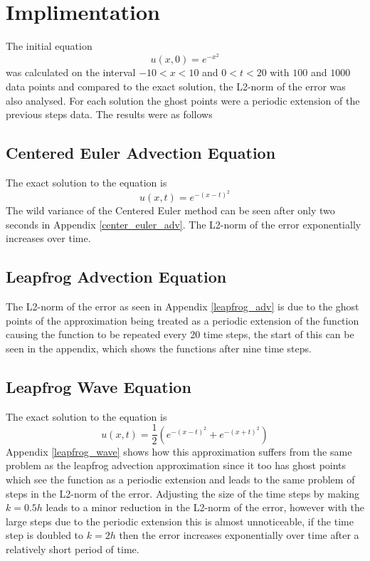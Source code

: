 \section{Implimentation}
The initial equation
\begin{equation}
  u(x,0) = e^{-x^2}
\end{equation}
was calculated on the interval $-10<x<10$ and $0<t<20$ with $100$ and $1000$ data points and compared to the exact solution, the L2-norm of the error was also analysed. For each solution the ghost points were a periodic extension of the previous steps data. The results were as follows
\subsection{Centered Euler Advection Equation}
The exact solution to the equation is
\begin{equation}
u(x,t) = e^{-(x-t)^2}
\end{equation}
The wild variance of the Centered Euler method can be seen after only two seconds in Appendix \ref{center_euler_adv}. The L2-norm of the error exponentially increases over time.
\subsection{Leapfrog Advection Equation}
The L2-norm of the error as seen in Appendix \ref{leapfrog_adv} is due to the ghost points of the approximation being treated as a periodic extension of the function causing the function to be repeated every 20 time steps, the start of this can be seen in the appendix, which shows the functions after nine time steps.
\subsection{Leapfrog Wave Equation}
The exact solution to the equation is
\begin{equation}
u(x,t) = \frac{1}{2}(e^{-(x-t)^2} + e^{-(x+t)^2})
\end{equation}
Appendix \ref{leapfrog_wave} shows how this approximation suffers from the same problem as the leapfrog advection approximation since it too has ghost points which see the function as a periodic extension and leads to the same problem of steps in the L2-norm of the error. Adjusting the size of the time steps by making $k=0.5h$ leads to a minor reduction in the L2-norm of the error, however with the large steps due to the periodic extension this is almost unnoticeable, if the time step is doubled to $k=2h$ then the error increases exponentially over time after a relatively short period of time.
